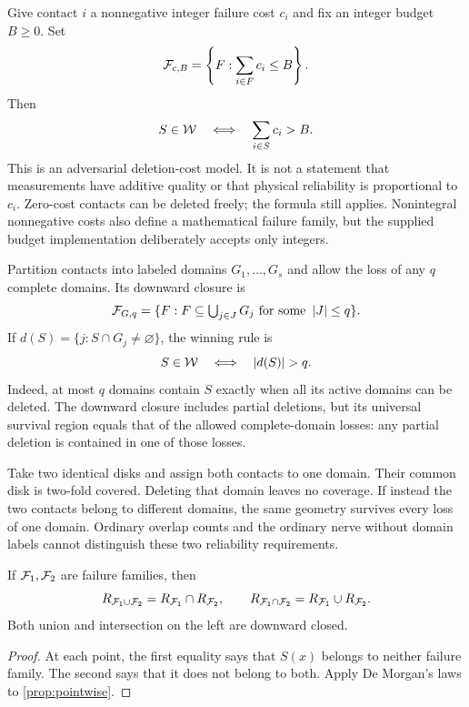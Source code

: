 \begin{example}\label{ex:weighted}
Give contact $i$ a nonnegative integer failure cost $c_i$ and fix an integer budget $B\ge0$. Set
\[
\mathcal F_{c,B}=\left\{F:\sum_{i\in F}c_i\le B\right\}.
\]
Then
\begin{equation}\label{eq:weighted-rule}
S\in\mathcal W\quad\Longleftrightarrow\quad\sum_{i\in S}c_i>B.
\end{equation}
This is an adversarial deletion-cost model. It is not a statement that measurements have additive quality or that physical reliability is proportional to $c_i$. Zero-cost contacts can be deleted freely; the formula still applies. Nonintegral nonnegative costs also define a mathematical failure family, but the supplied budget implementation deliberately accepts only integers.
\end{example}

\begin{example}\label{ex:domains}
Partition contacts into labeled domains $G_1,\ldots,G_s$ and allow the loss of any $q$ complete domains. Its downward closure is
\[
\mathcal F_{G,q}=\{F:F\subseteq\textstyle\bigcup_{j\in J}G_j\text{ for some }\left|J\right|\le q\}.
\]
If $d(S)=\{j:S\cap G_j\ne\varnothing\}$, the winning rule is
\begin{equation}\label{eq:domain-rule}
S\in\W\quad\Longleftrightarrow\quad\abs{d(S)}>q.
\end{equation}
Indeed, at most $q$ domains contain $S$ exactly when all its active domains can be deleted. The downward closure includes partial deletions, but its universal survival region equals that of the allowed complete-domain losses: any partial deletion is contained in one of those losses.
\end{example}

\begin{example}
Take two identical disks and assign both contacts to one domain. Their common disk is two-fold covered. Deleting that domain leaves no coverage. If instead the two contacts belong to different domains, the same geometry survives every loss of one domain. Ordinary overlap counts and the ordinary nerve without domain labels cannot distinguish these two reliability requirements.
\end{example}

\begin{proposition}\label{prop:combining}
If $\mathcal F_1,\mathcal F_2$ are failure families, then
\[
R_{\mathcal F_1\cup\mathcal F_2}=R_{\mathcal F_1}\cap R_{\mathcal F_2},\qquad
R_{\mathcal F_1\cap\mathcal F_2}=R_{\mathcal F_1}\cup R_{\mathcal F_2}.
\]
Both union and intersection on the left are downward closed.
\end{proposition}
\begin{proof}
At each point, the first equality says that $S(x)$ belongs to neither failure family. The second says that it does not belong to both. Apply De Morgan's laws to \cref{prop:pointwise}.
\end{proof}

